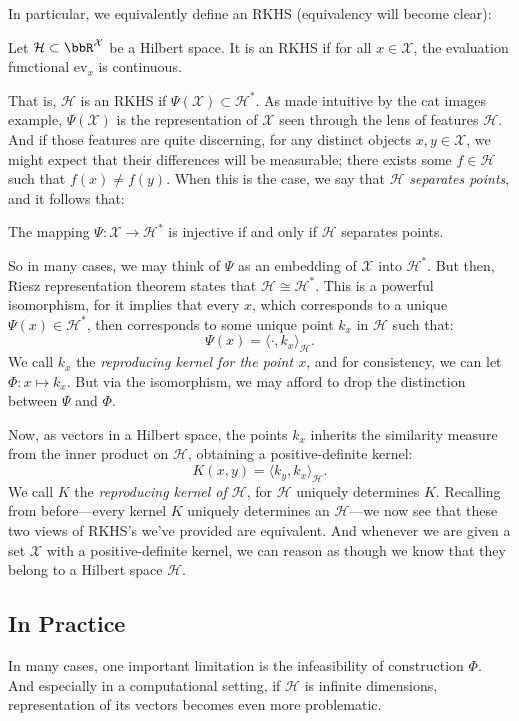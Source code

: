 \documentclass[twoside,11pt]{homework}
\begin{document}
\begin{multicols}{2}
In particular, we equivalently define an RKHS (equivalency will become clear):
\begin{definition}
Let $\mathcal{H} \subset \bbR^{\mathcal{X}}$ be a Hilbert space. It is an RKHS if for all $x \in \mathcal{X}$, the evaluation functional $\mathrm{ev}_x$ is continuous.
\end{definition}
That is, $\mathcal{H}$ is an RKHS if $\Psi(\mathcal{X}) \subset \mathcal{H}^*$. As made intuitive by the cat images example, $\Psi(\mathcal{X})$ is the representation of $\mathcal{X}$ seen through the lens of features $\mathcal{H}$. And if those features are quite discerning, for any distinct objects $x,y \in \mathcal{X}$, we might expect that their differences will be measurable; there exists some $f \in \mathcal{H}$ such that $f(x) \ne f(y)$. When this is the case, we say that $\mathcal{H}$ \emph{separates points}, and it follows that:
\begin{proposition}
  The mapping $\Psi : \mathcal{X} \to \mathcal{H}^*$ is injective if and only if $\mathcal{H}$ separates points.
\end{proposition}

So in many cases, we may think of $\Psi$ as an embedding of $\mathcal{X}$ into $\mathcal{H}^*$. But then, Riesz representation theorem states that $\mathcal{H} \cong \mathcal{H}^*$. This is a powerful isomorphism, for it implies that every $x$, which corresponds to a unique $\Psi(x) \in \mathcal{H}^*$, then corresponds to some unique point $k_x$ in $\mathcal{H}$ such that:
\[\Psi(x) = \langle \cdot, k_x\rangle_\mathcal{H}.\]
We call $k_x$ the \emph{reproducing kernel for the point $x$}, and for consistency, we can let $\Phi: x \mapsto k_x$. But via the isomorphism, we may afford to drop the distinction between $\Psi$ and $\Phi$.

Now, as vectors in a Hilbert space, the points $k_x$ inherits the similarity measure from the inner product on $\mathcal{H}$, obtaining a positive-definite kernel:
\[K(x,y) = \langle k_y, k_x\rangle_\mathcal{H}.\]
We call $K$ the \emph{reproducing kernel of $\mathcal{H}$}, for $\mathcal{H}$ uniquely determines $K$. Recalling from before---every kernel $K$ uniquely determines an $\mathcal{H}$---we now see that these two views of RKHS's we've provided are equivalent. And whenever we are given a set $\mathcal{X}$ with a positive-definite kernel, we can reason as though we know that they belong to a Hilbert space $\mathcal{H}$.

\subsection{In Practice}
In many cases, one important limitation is the infeasibility of construction $\Phi$. And especially in a computational setting, if $\mathcal{H}$ is infinite dimensions, representation of its vectors becomes even more problematic.


\end{multicols}
\end{document}
